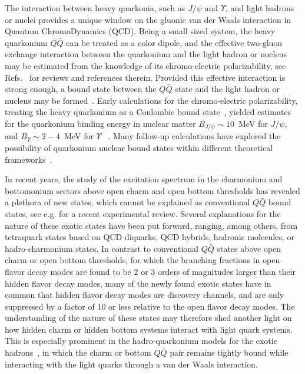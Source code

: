 \documentclass[prd,amsmath,twocolumn,floatfix,amssymb, preprintnumbers, linenumbers,nofootinbib, superscriptaddress]{revtex4}
\begin{document}
The interaction between heavy quarkonia, such as $J/\psi$ and $\Upsilon$, and light hadrons or nuclei provides a unique window on the gluonic van der Waals interaction in Quantum ChromoDynamics (QCD). Being a small sized system, the heavy quarkonium $Q \bar Q$ can be treated as a color dipole, and the effective two-gluon exchange interaction between the quarkonium and the light hadron  or nucleus may be estimated from the knowledge of its chromo-electric polarizability, see 
Refs.~\cite{Kharzeev:1995ij,Voloshin:2007dx,Hosaka:2016ypm} for reviews and references therein. 
Provided this effective interaction is strong enough, 
a bound state between the
$Q \bar Q$ state and the light hadron or  nucleus may be formed~\cite{Brodsky:1989jd, Wasson:1991fb, Luke:1992tm}. 
Early calculations for the chromo-electric polarizability,  treating the heavy quarkonium as a Coulombic bound state~\cite{Peskin:1979va,Bhanot:1979vb}, 
yielded estimates for the quarkonium binding energy in 
nuclear matter $B_{J/\psi} \sim 10$~MeV for $J/\psi$, and $B_{\Upsilon} \sim 2 - 4$~MeV for $\Upsilon$ ~\cite{Luke:1992tm}. Many follow-up calculations have explored the possibility of quarkonium nuclear bound states within different theoretical  frameworks~\cite{Brodsky:1997gh, Ko:2000jx, Tsushima:2011kh, Yokota:2013sfa, Beane:2014sda, Krein:2019gcm}. 

In recent years, the study of the excitation spectrum in the charmonium and bottomonium sectors above open charm and  open bottom thresholds has revealed a plethora of new  states, which cannot be explained as conventional $Q \bar Q$ bound states, see e.g. \cite{Olsen:2017bmm} for a recent experimental review. Several explanations for the nature of these exotic states have been put forward, ranging, among others, from tetraquark states based on QCD diquarks, QCD hybrids, hadronic molecules, or hadro-charmonium states. In contrast to conventional $Q \bar Q$ states above open charm or open bottom thresholds, for which the branching fractions in open flavor decay modes are found to be 2 or 3 orders of magnitudes larger than their hidden flavor decay modes, many of the newly found exotic states have in common that hidden flavor decay modes are discovery channels, and are only suppressed by a factor of 10 or less relative to the open flavor 
decay modes. The understanding of the nature of these states may therefore shed another light on how hidden charm or hidden bottom systems interact with light quark systems. This is especially prominent in the hadro-quarkonium models for the exotic hadrons~\cite{Dubynskiy:2008mq}, in which 
the charm or bottom $Q \bar Q$ pair remains tightly bound while interacting with the light quarks through a van der Waals interaction.
\end{document}
